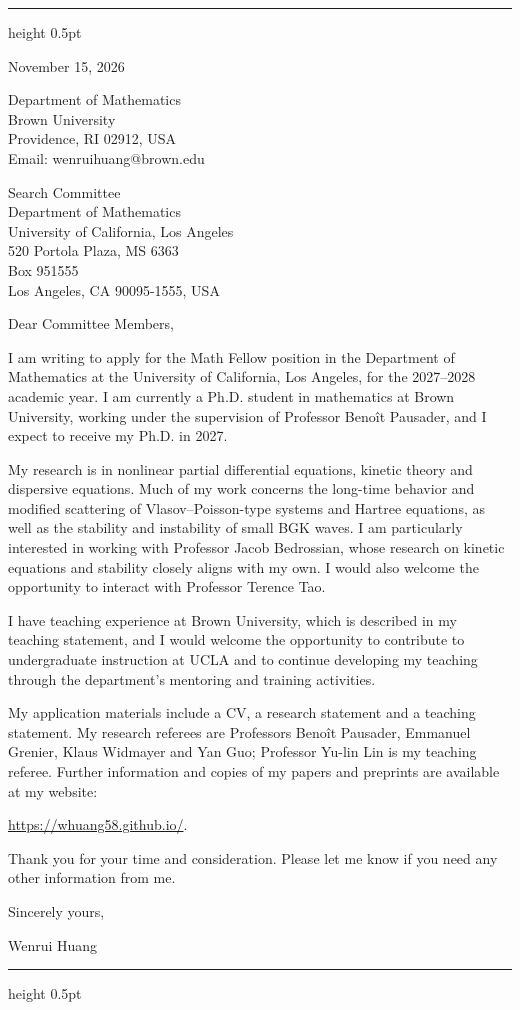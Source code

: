 \documentclass[10pt]{article}
\begin{document}
\vspace{0.08in}
\hrule height 0.5pt

\vspace{0.47in}
\hfill
\begin{minipage}{2.27in}
November 15, 2026

\vspace{0.16in}
Department of Mathematics\\
Brown University\\
Providence, RI 02912, USA\\
Email: wenrui\textunderscore huang@brown.edu
\end{minipage}

\vspace{0.30in}
Search Committee\\
Department of Mathematics\\
University of California, Los Angeles\\
520 Portola Plaza, MS 6363\\
Box 951555\\
Los Angeles, CA 90095-1555, USA

\vspace{0.16in}
Dear Committee Members,

I am writing to apply for the Math Fellow position in the Department of Mathematics at the University of California, Los Angeles, for the 2027--2028 academic year. I am currently a Ph.D. student in mathematics at Brown University, working under the supervision of Professor Beno\^{i}t Pausader, and I expect to receive my Ph.D. in 2027.

My research is in nonlinear partial differential equations, kinetic theory and dispersive equations. Much of my work concerns the long-time behavior and modified scattering of Vlasov--Poisson-type systems and Hartree equations, as well as the stability and instability of small BGK waves. I am particularly interested in working with Professor Jacob Bedrossian, whose research on kinetic equations and stability closely aligns with my own. I would also welcome the opportunity to interact with Professor Terence Tao.

I have teaching experience at Brown University, which is described in my teaching statement, and I would welcome the opportunity to contribute to undergraduate instruction at UCLA and to continue developing my teaching through the department's mentoring and training activities.

My application materials include a CV, a research statement and a teaching statement. My research referees are Professors Beno\^{i}t Pausader, Emmanuel Grenier, Klaus Widmayer and Yan Guo; Professor Yu-lin Lin is my teaching referee. Further information and copies of my papers and preprints are available at my website:

\url{https://whuang58.github.io/}.

\medskip
Thank you for your time and consideration. Please let me know if you need any other information from me.

\vspace{0.12in}
Sincerely yours,

\vspace{0.12in}
Wenrui Huang

\vfill
\hrule height 0.5pt
\end{document}
